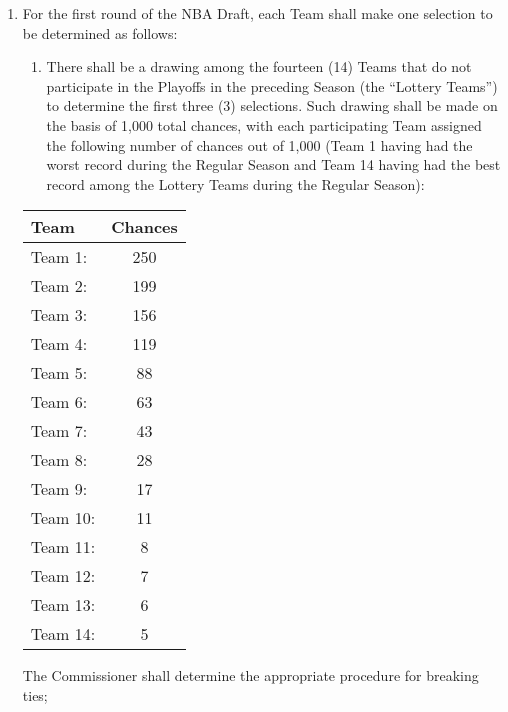\documentclass[]{book}
\providecommand{\tightlist}{%
  \setlength{\itemsep}{0pt}\setlength{\parskip}{0pt}}
\theoremstyle{definition}
\theoremstyle{definition}
\theoremstyle{definition}
\theoremstyle{remark}
\begin{document}
\begin{enumerate}
\def\labelenumi{(\alph{enumi})}
\tightlist
\item
  For the first round of the NBA Draft, each Team shall make one
  selection to be determined as follows:

  \begin{enumerate}
  \def\labelenumii{(\roman{enumii})}
  \tightlist
  \item
    There shall be a drawing among the fourteen (14) Teams that do not
    participate in the Playoffs in the preceding Season (the ``Lottery
    Teams'') to determine the first three (3) selections. Such drawing
    shall be made on the basis of 1,000 total chances, with each
    participating Team assigned the following number of chances out of
    1,000 (Team 1 having had the worst record during the Regular Season
    and Team 14 having had the best record among the Lottery Teams
    during the Regular Season):
  \end{enumerate}

  \begin{longtable}[]{@{}lc@{}}
  \toprule
  Team & Chances\tabularnewline
  \midrule
  \endhead
  Team 1: & 250\tabularnewline
  Team 2: & 199\tabularnewline
  Team 3: & 156\tabularnewline
  Team 4: & 119\tabularnewline
  Team 5: & 88\tabularnewline
  Team 6: & 63\tabularnewline
  Team 7: & 43\tabularnewline
  Team 8: & 28\tabularnewline
  Team 9: & 17\tabularnewline
  Team 10: & 11\tabularnewline
  Team 11: & 8\tabularnewline
  Team 12: & 7\tabularnewline
  Team 13: & 6\tabularnewline
  Team 14: & 5\tabularnewline
  \bottomrule
  \end{longtable}

  The Commissioner shall determine the appropriate procedure for
  breaking ties;


\end{enumerate}
\end{document}
